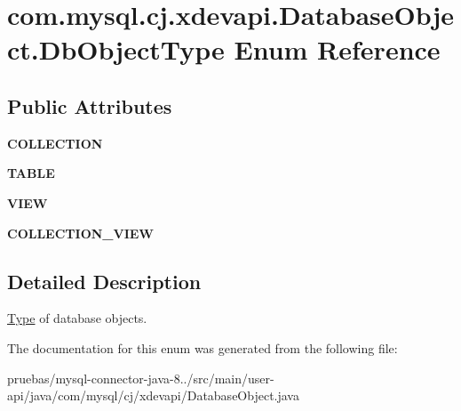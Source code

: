 \hypertarget{enumcom_1_1mysql_1_1cj_1_1xdevapi_1_1_database_object_1_1_db_object_type}{}\section{com.\+mysql.\+cj.\+xdevapi.\+Database\+Object.\+Db\+Object\+Type Enum Reference}
\label{enumcom_1_1mysql_1_1cj_1_1xdevapi_1_1_database_object_1_1_db_object_type}
\subsection*{Public Attributes}
\begin{DoxyCompactItemize}
\item 
\mbox{\label{enumcom_1_1mysql_1_1cj_1_1xdevapi_1_1_database_object_1_1_db_object_type_a907d4fe5b0571a5aaa83cb6bbb6346bf}} 
{\bfseries C\+O\+L\+L\+E\+C\+T\+I\+ON}
\item 
\mbox{\label{enumcom_1_1mysql_1_1cj_1_1xdevapi_1_1_database_object_1_1_db_object_type_a760962143f881538e3c2b2a68cf34ab3}} 
{\bfseries T\+A\+B\+LE}
\item 
\mbox{\label{enumcom_1_1mysql_1_1cj_1_1xdevapi_1_1_database_object_1_1_db_object_type_a55a77a337fcc055c485de95e66a8f8fb}} 
{\bfseries V\+I\+EW}
\item 
\mbox{\label{enumcom_1_1mysql_1_1cj_1_1xdevapi_1_1_database_object_1_1_db_object_type_a2af5a6327c79769362750bd3827ac6ae}} 
{\bfseries C\+O\+L\+L\+E\+C\+T\+I\+O\+N\+\_\+\+V\+I\+EW}
\end{DoxyCompactItemize}


\subsection{Detailed Description}
\mbox{\hyperlink{enumcom_1_1mysql_1_1cj_1_1xdevapi_1_1_type}{Type}} of database objects. 

The documentation for this enum was generated from the following file\+:\begin{DoxyCompactItemize}
\item 
pruebas/mysql-\/connector-\/java-\/8../src/main/user-\/api/java/com/mysql/cj/xdevapi/Database\+Object.\+java\end{DoxyCompactItemize}
